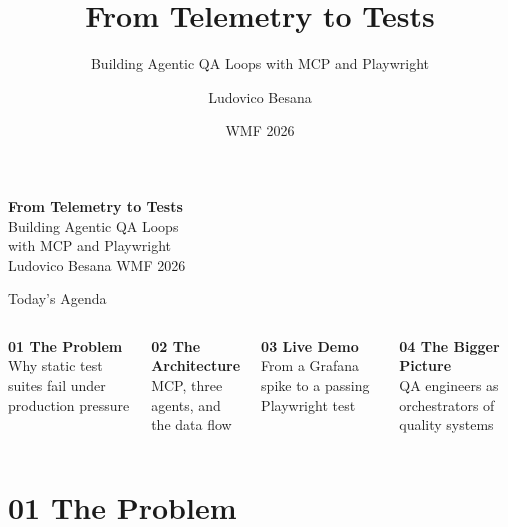 \documentclass[aspectratio=169,10pt]{beamer}
\title{From Telemetry to Tests}
\subtitle{Building Agentic QA Loops with MCP and Playwright}
\author{Ludovico Besana}
\date{WMF 2026}
\institute{}
\begin{document}

{
\begin{frame}[plain]
  \vspace{1.6cm}
  {\color{white}\Huge\bfseries From Telemetry to Tests}\\[0.4em]
  {\color{white!75}\large Building Agentic QA Loops\\with MCP and Playwright}\\[2em]
  {\color{white!60}\normalsize Ludovico Besana \quad\textperiodcentered{}\quad WMF 2026}
\end{frame}
}

\begin{frame}{Today's Agenda}
  \begin{columns}[T]
      \textbf{\color{docblue}01 \quad The Problem}\\[0.3em]
      \small Why static test suites fail under production pressure

      \vspace{1em}
      \textbf{\color{docblue}02 \quad The Architecture}\\[0.3em]
      \small MCP, three agents, and the data flow

      \textbf{\color{docblue}03 \quad Live Demo}\\[0.3em]
      \small From a Grafana spike to a passing Playwright test

      \vspace{1em}
      \textbf{\color{docblue}04 \quad The Bigger Picture}\\[0.3em]
      \small QA engineers as orchestrators of quality systems
  \end{columns}
\end{frame}

\section{01 \quad The Problem}
\end{document}
